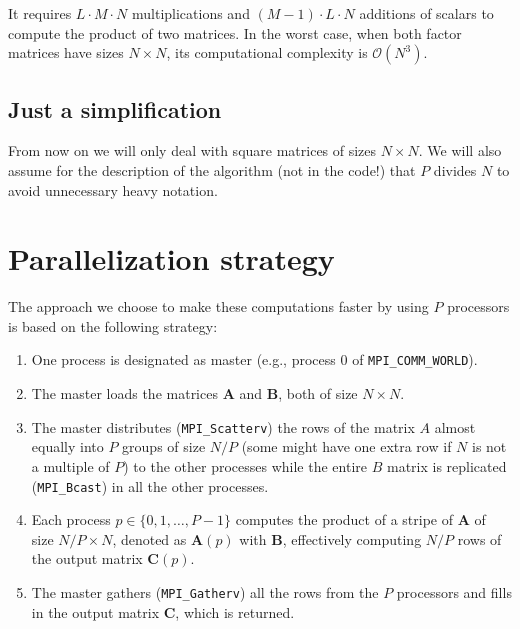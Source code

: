 \documentclass[11pt]{article}
\begin{document}
It requires $L \cdot M \cdot N$ multiplications and $(M - 1) \cdot L \cdot N$ additions of scalars to compute the product of two matrices. In the worst case, when both factor matrices have sizes $N \times N$, its computational complexity is $\mathcal{O}(N^3)$.

\subsection{Just a simplification}
From now on we will only deal with square matrices of sizes $N \times N$. We will also assume for the description of the algorithm (not in the code!) that $P$ divides $N$ to avoid unnecessary heavy notation.

\section{Parallelization strategy}
The approach we choose to make these computations faster by using $P$ processors is based on the following strategy:
\begin{enumerate}
    \item One process is designated as master (e.g., process $0$ of \verb|MPI_COMM_WORLD|).
    \item The master loads the matrices $\mathbf{A}$ and $\mathbf{B}$, both of size $N\times N$.
    \item The master distributes (\verb|MPI_Scatterv|) the rows of the matrix $A$ almost equally into $P$ groups of size $N/P$ (some might have one extra row if $N$ is not a multiple of $P$) to the other processes while the entire $B$ matrix is replicated (\verb|MPI_Bcast|) in all the other processes.
    \item Each process $p \in \{0, 1, \dots, P - 1\}$ computes the product of a stripe of $\mathbf{A}$ of size $N/P \times N$, denoted as $\mathbf{A}(p)$ with $\mathbf{B}$, effectively computing $N/P$ rows of the output matrix $\mathbf{C}(p)$.
    \item The master gathers (\verb|MPI_Gatherv|) all the rows from the $P$ processors and fills in the output matrix $\mathbf{C}$, which is returned.
\end{enumerate}
\end{document}

